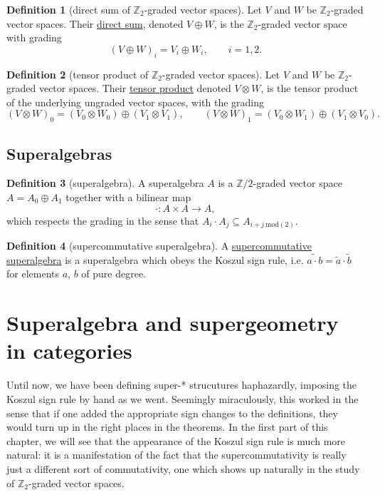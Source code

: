 \documentclass[a4paper]{report}
\newcommand{\Z}{\mathbb{Z}}
\newcommand{\defn}[1]{\ul{#1}}
\theoremstyle{definition}
\newtheorem{definition}{Definition}[section]
\theoremstyle{plain}
\theoremstyle{remark}
\begin{document}
\begin{definition}[direct sum of $\Z_{2}$-graded vector spaces]
  \label{def:directsumofz2gradedvectorspaces}
  Let $V$ and $W$ be $\Z_{2}$-graded vector spaces. Their \defn{direct sum}, denoted $V \oplus W$, is the $\Z_{2}$-graded vector space with grading
  \begin{equation*}
    (V \oplus W)_{i} = V_{i} \oplus W_{i},\qquad i = 1, 2.
  \end{equation*}
\end{definition} 
\begin{definition}[tensor product of $\Z_{2}$-graded vector spaces]
  \label{def:tensorproduttofz2gradedvectorspaces}
  Let $V$ and $W$ be $\Z_{2}$-graded vector spaces. Their \defn{tensor product} denoted $V \otimes W$, is the tensor product of the underlying ungraded vector spaces, with the grading
  \begin{equation*}
    (V \otimes W)_{0} = (V_{0} \otimes W_{0})\oplus(V_{1} \otimes V_{1}),\qquad (V \otimes W)_{1} = (V_{0} \otimes W_{1})\oplus(V_{1} \otimes V_{0}).
  \end{equation*}
\end{definition}

\section{Superalgebras}

\begin{definition}[superalgebra]
  \label{def:superalgebra}
  A superalgebra $A$ is a $\Z/2$-graded vector space $A = A_{0} \oplus A_{1}$ together with a bilinear map
  \begin{equation*}
    \cdot\colon A \times A \to A,
  \end{equation*}
  which respects the grading in the sense that $A_{i} \cdot A_{j} \subseteq A_{i+j\ \mathrm{mod}(2)}$.
\end{definition}

\begin{definition}[supercommutative superalgebra]
  \label{def:supercommutativesuperalgebra}
  A \defn{supercommutative superalgebra} is a superalgebra which obeys the Koszul sign rule, i.e.  $\tilde{a \cdot b} = \tilde{a} \cdot \tilde{b}$ for elements $a$, $b$ of pure degree.
\end{definition}

\chapter{Superalgebra and supergeometry in categories}
Until now, we have been defining super-* strucutures haphazardly, imposing the Koszul sign rule by hand as we went. Seemingly miraculously, this worked in the sense that if one added the appropriate sign changes to the definitions, they would turn up in the right places in the theorems. In the first part of this chapter, we will see that the appearance of the Koszul sign rule is much more natural: it is a manifestation of the fact that the supercommutativity is really just a different sort of commutativity, one which shows up naturally in the study of $\Z_{2}$-graded vector spaces.
\end{document}
